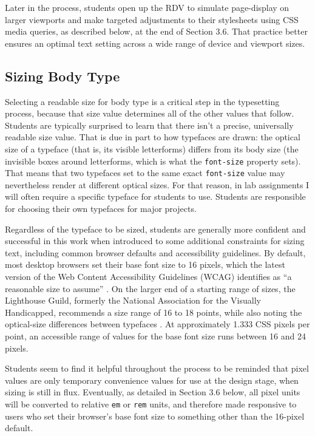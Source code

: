 \documentclass[sigplan,screen]{acmart}
\begin{document}
Later in the process, students open up the RDV to simulate page-display on larger viewports and make targeted adjustments to their stylesheets using CSS media queries, as described below, at the end of Section 3.6. That practice better ensures an optimal text setting across a wide range of device and viewport sizes.

\subsection{Sizing Body Type}

Selecting a readable size for body type is a critical step in the typesetting process, because that size value determines all of the other values that follow. Students are typically surprised to learn that there isn’t a precise, universally readable size value. That is due in part to how typefaces are drawn: the optical size of a typeface (that is, its visible letterforms) differs from its body size (the invisible boxes around letterforms, which is what the \verb|font-size| property sets). That means that two typefaces set to the same exact \verb|font-size| value may nevertheless render at different optical sizes. For that reason, in lab assignments I will often require a specific typeface for students to use. Students are responsible for choosing their own typefaces for major projects.

Regardless of the typeface to be sized, students are generally more confident and successful in this work when introduced to some additional constraints for sizing text, including common browser defaults and accessibility guidelines. By default, most desktop browsers set their base font size to 16 pixels, which the latest version of the Web Content Accessibility Guidelines (WCAG) identifies as “a reasonable size to assume” \cite{w3c:wcag}. On the larger end of a starting range of sizes, the Lighthouse Guild, formerly the National Association for the Visually Handicapped, recommends a size range of 16 to 18 points, while also noting the optical-size differences between typefaces \cite{lhg:mtl}. At approximately 1.333 CSS pixels per point, an accessible range of values for the base font size runs between 16 and 24 pixels.

Students seem to find it helpful throughout the process to be reminded that pixel values are only temporary convenience values for use at the design stage, when sizing is still in flux. Eventually, as detailed in Section 3.6 below, all pixel units will be converted to relative \verb|em| or \verb|rem| units, and therefore made responsive to users who set their browser's base font size to something other than the 16-pixel default.
\end{document}
